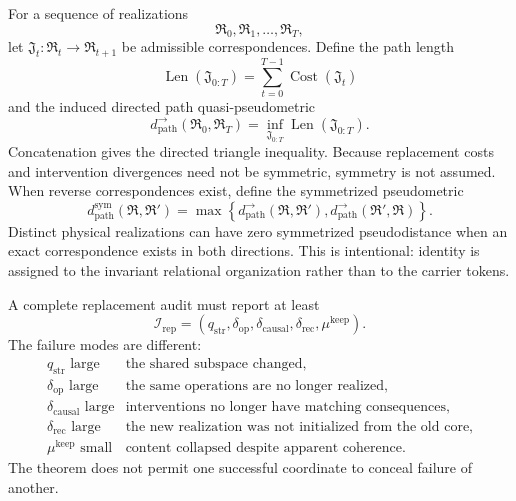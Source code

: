 For a sequence of realizations
\[
\mathfrak R_0,\mathfrak R_1,\ldots,\mathfrak R_T,
\]
let \(\mathfrak J_t:\mathfrak R_t\to\mathfrak R_{t+1}\) be admissible
correspondences. Define the path length
\[
\operatorname{Len}(\mathfrak J_{0:T})
=
\sum_{t=0}^{T-1}\operatorname{Cost}(\mathfrak J_t)
\]
and the induced directed path quasi-pseudometric
\[
\boxed{
d_{\mathrm{path}}^{\rightarrow}(\mathfrak R_0,\mathfrak R_T)
=
\inf_{\mathfrak J_{0:T}}
\operatorname{Len}(\mathfrak J_{0:T}).
}
\]
Concatenation gives the directed triangle inequality. Because replacement
costs and intervention divergences need not be symmetric, symmetry is not
assumed. When reverse correspondences exist, define the symmetrized
pseudometric
\[
\boxed{
d_{\mathrm{path}}^{\mathrm{sym}}(\mathfrak R,\mathfrak R')
=
\max\left\{
 d_{\mathrm{path}}^{\rightarrow}(\mathfrak R,\mathfrak R'),
 d_{\mathrm{path}}^{\rightarrow}(\mathfrak R',\mathfrak R)
\right\}.
}
\]
Distinct physical realizations can have zero symmetrized pseudodistance when
an exact correspondence exists in both directions. This is intentional:
identity is assigned to the invariant relational organization rather than to
the carrier tokens.


A complete replacement audit must report at least
\[
\boxed{
\mathcal I_{\mathrm{rep}}
=
\left(
q_{\mathrm{str}},
\delta_{\mathrm{op}},
\delta_{\mathrm{causal}},
\delta_{\mathrm{rec}},
\mu^{\mathrm{keep}}
\right).
}
\]
The failure modes are different:
\[
\begin{array}{ll}
q_{\mathrm{str}}\text{ large}
&\text{the shared subspace changed},\\
\delta_{\mathrm{op}}\text{ large}
&\text{the same operations are no longer realized},\\
\delta_{\mathrm{causal}}\text{ large}
&\text{interventions no longer have matching consequences},\\
\delta_{\mathrm{rec}}\text{ large}
&\text{the new realization was not initialized from the old core},\\
\mu^{\mathrm{keep}}\text{ small}
&\text{content collapsed despite apparent coherence}.
\end{array}
\]
The theorem does not permit one successful coordinate to conceal failure of
another.
